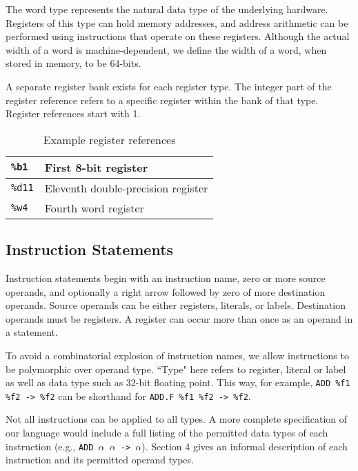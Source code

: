 The word type represents the natural data type of the underlying hardware.
Registers of this type can hold memory addresses, and address arithmetic
can be performed using instructions that operate on these registers.
Although the actual width of a word is machine-dependent,
we define the width of a word, when stored in memory, to be 64-bits.

A separate register bank exists for each register type. The integer
part of the register reference refers to a specific register
within the bank of that type. Register references start with 1.

\begin{table}[h!]
  \begin{center}
    \begin{tabular}{|l|l|}
      \hline
      \texttt{\%b1}  & First 8-bit register               \\ \hline
      \texttt{\%d11} & Eleventh double-precision register \\ \hline
      \texttt{\%w4}  & Fourth word register               \\ \hline
    \end{tabular}
  \end{center}
  \caption{Example register references}
\end{table}

\subsection{Instruction Statements}

Instruction statements begin with an instruction name, zero or
more source operands, and optionally a right arrow followed by
zero of more destination operands. Source operands can be either registers,
literals, or labels. Destination operands must be registers.
A register can occur more than once as an operand in a statement.

To avoid a combinatorial explosion of instruction names,
we allow instructions to be polymorphic over operand type.
``Type" here refers to register, literal or label as well
as data type such as 32-bit floating point.
This way, for example, \texttt{ADD \%f1 \%f2 -> \%f2} can be shorthand
for \texttt{ADD.F \%f1 \%f2 -> \%f2}.

Not all instructions can be applied to all types.
A more complete specification of our language would include
a full listing of the permitted data types of each instruction
(e.g., \texttt{ADD $\alpha$ $\alpha$ -> $\alpha$}). Section 4 gives an informal description of each instruction
and its permitted operand types.

